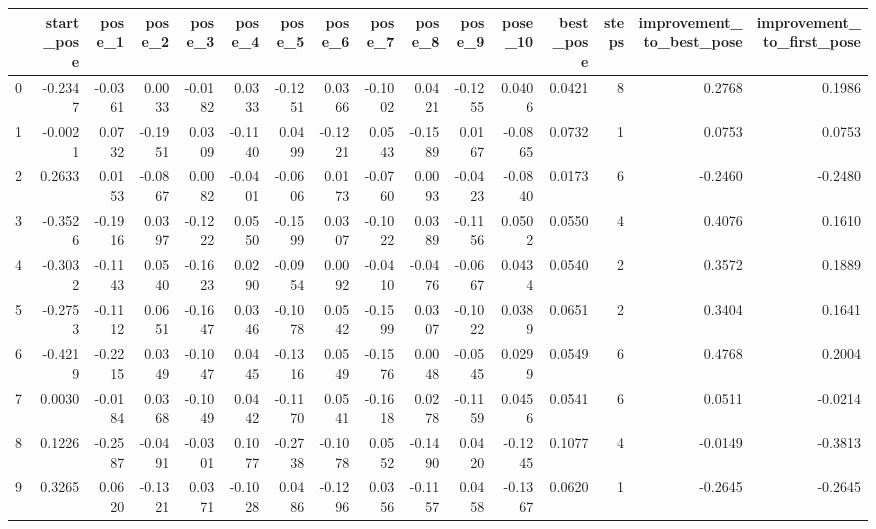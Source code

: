 \begin{tabular}{lrrrrrrrrrrrrrrr}
\toprule
{} &  start\_pose &  pose\_1 &  pose\_2 &  pose\_3 &  pose\_4 &  pose\_5 &  pose\_6 &  pose\_7 &  pose\_8 &  pose\_9 &  pose\_10 &  best\_pose &  steps &  improvement\_to\_best\_pose &  improvement\_to\_first\_pose \\
\midrule
0  &     -0.2347 & -0.0361 &  0.0033 & -0.0182 &  0.0333 & -0.1251 &  0.0366 & -0.1002 &  0.0421 & -0.1255 &   0.0406 &     0.0421 &      8 &                    0.2768 &                     0.1986 \\
1  &     -0.0021 &  0.0732 & -0.1951 &  0.0309 & -0.1140 &  0.0499 & -0.1221 &  0.0543 & -0.1589 &  0.0167 &  -0.0865 &     0.0732 &      1 &                    0.0753 &                     0.0753 \\
2  &      0.2633 &  0.0153 & -0.0867 &  0.0082 & -0.0401 & -0.0606 &  0.0173 & -0.0760 &  0.0093 & -0.0423 &  -0.0840 &     0.0173 &      6 &                   -0.2460 &                    -0.2480 \\
3  &     -0.3526 & -0.1916 &  0.0397 & -0.1222 &  0.0550 & -0.1599 &  0.0307 & -0.1022 &  0.0389 & -0.1156 &   0.0502 &     0.0550 &      4 &                    0.4076 &                     0.1610 \\
4  &     -0.3032 & -0.1143 &  0.0540 & -0.1623 &  0.0290 & -0.0954 &  0.0092 & -0.0410 & -0.0476 & -0.0667 &   0.0434 &     0.0540 &      2 &                    0.3572 &                     0.1889 \\
5  &     -0.2753 & -0.1112 &  0.0651 & -0.1647 &  0.0346 & -0.1078 &  0.0542 & -0.1599 &  0.0307 & -0.1022 &   0.0389 &     0.0651 &      2 &                    0.3404 &                     0.1641 \\
6  &     -0.4219 & -0.2215 &  0.0349 & -0.1047 &  0.0445 & -0.1316 &  0.0549 & -0.1576 &  0.0048 & -0.0545 &   0.0299 &     0.0549 &      6 &                    0.4768 &                     0.2004 \\
7  &      0.0030 & -0.0184 &  0.0368 & -0.1049 &  0.0442 & -0.1170 &  0.0541 & -0.1618 &  0.0278 & -0.1159 &   0.0456 &     0.0541 &      6 &                    0.0511 &                    -0.0214 \\
8  &      0.1226 & -0.2587 & -0.0491 & -0.0301 &  0.1077 & -0.2738 & -0.1078 &  0.0552 & -0.1490 &  0.0420 &  -0.1245 &     0.1077 &      4 &                   -0.0149 &                    -0.3813 \\
9  &      0.3265 &  0.0620 & -0.1321 &  0.0371 & -0.1028 &  0.0486 & -0.1296 &  0.0356 & -0.1157 &  0.0458 &  -0.1367 &     0.0620 &      1 &                   -0.2645 &                    -0.2645 \\

\end{tabular}
